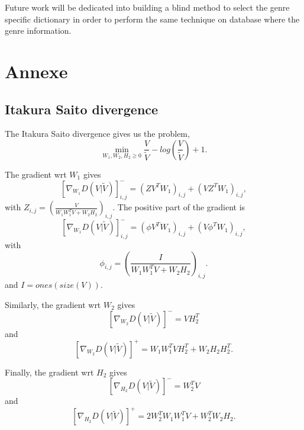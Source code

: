 \documentclass{article}
\begin{document}
Future work will be dedicated into building a blind method to select the genre specific dictionary in order to perform the same technique on database where the genre information. 



\section{Annexe}
 
\subsection{Itakura Saito divergence}\label{ISdisteq}
The Itakura Saito divergence gives us the problem,
$$\min_{W_1,W_2,H_2 \geq 0} \frac{V}{\tilde{V}} - log(\frac{V}{\tilde{V}}) +1.$$

The gradient wrt $W_1$ gives
$$[\nabla_{W_1} D(V|\tilde{V})]_{i,j}^{-} = (ZV^TW_1)_{i,j} + (VZ^TW_1)_{i,j},$$
with $Z_{i,j} = (\frac{V}{W_1W_1^TV + W_2H_2})_{i,j}$. 
The positive part of the gradient is
$$[\nabla_{W_1} D(V|\tilde{V})]_{i,j}^{-} = (\phi V^TW_1)_{i,j} + (V \phi^T W_1)_{i,j},$$
with $$ \phi_{i,j} = (\frac{I}{W_1W_1^TV + W_2H_2})_{i,j}.$$ and $I = ones(size(V))$.


Similarly, the gradient wrt $W_2$ gives
$$ [\nabla_{W_2} D(V|\tilde{V})]^{-} = VH_2^T $$
and
$$ [\nabla_{W_2} D(V|\tilde{V})]^{+} = W_1W_1^TVH_2^T + W_2H_2H_2^T.$$

Finally, the gradient wrt $H_2$ gives
$$ [\nabla_{H_2} D(V|\tilde{V})]^{-} = W_2^TV  $$
and
$$ [\nabla_{H_2} D(V|\tilde{V})]^{+} = 2W_2^TW_1W_1^TV + W_2^TW_2H_2. $$





\end{document}
